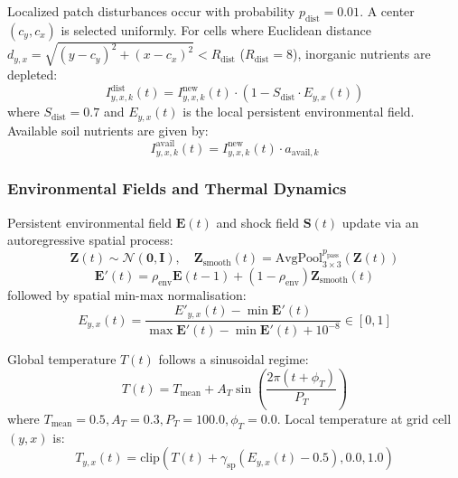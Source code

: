 \documentclass[11pt,a4paper]{article}
\begin{document}
Localized patch disturbances occur with probability $p_{\text{dist}} = 0.01$. A center $(c_y, c_x)$ is selected uniformly. For cells where Euclidean distance $d_{y,x} = \sqrt{(y-c_y)^2 + (x-c_x)^2} < R_{\text{dist}}$ ($R_{\text{dist}}=8$), inorganic nutrients are depleted:
\begin{equation}
I^{\text{dist}}_{y,x,k}(t) = I^{\text{new}}_{y,x,k}(t) \cdot \left(1 - S_{\text{dist}} \cdot E_{y,x}(t)\right)
\end{equation}
where $S_{\text{dist}} = 0.7$ and $E_{y,x}(t)$ is the local persistent environmental field. Available soil nutrients are given by:
\begin{equation}
I^{\text{avail}}_{y,x,k}(t) = I^{\text{new}}_{y,x,k}(t) \cdot a_{\text{avail}, k}
\end{equation}

\subsubsection{Environmental Fields and Thermal Dynamics}
Persistent environmental field $\mathbf{E}(t)$ and shock field $\mathbf{S}(t)$ update via an autoregressive spatial process:
\begin{equation}
\mathbf{Z}(t) \sim \mathcal{N}(\boldsymbol{0}, \mathbf{I}), \quad \mathbf{Z}_{\text{smooth}}(t) = \text{AvgPool}_{3\times 3}^{p_{\text{pass}}}\left(\mathbf{Z}(t)\right)
\end{equation}
\begin{equation}
\mathbf{E}'(t) = \rho_{\text{env}} \mathbf{E}(t-1) + (1 - \rho_{\text{env}}) \mathbf{Z}_{\text{smooth}}(t)
\end{equation}
followed by spatial min-max normalisation:
\begin{equation}
E_{y,x}(t) = \frac{E'_{y,x}(t) - \min \mathbf{E}'(t)}{\max \mathbf{E}'(t) - \min \mathbf{E}'(t) + 10^{-8}} \in [0, 1]
\end{equation}

Global temperature $T(t)$ follows a sinusoidal regime:
\begin{equation}
T(t) = T_{\text{mean}} + A_T \sin\left(\frac{2\pi (t + \phi_T)}{P_T}\right)
\end{equation}
where $T_{\text{mean}} = 0.5, A_T = 0.3, P_T = 100.0, \phi_T = 0.0$. Local temperature at grid cell $(y,x)$ is:
\begin{equation}
T_{y,x}(t) = \text{clip}\left(T(t) + \gamma_{\text{sp}} (E_{y,x}(t) - 0.5), 0.0, 1.0\right)
\end{equation}
\end{document}

